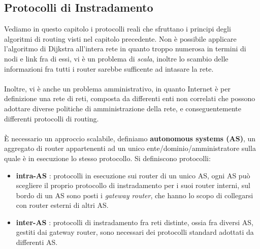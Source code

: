 \documentclass[12pt, letterpaper]{article}
\newcommand{\acc}{\\\hphantom{}\\}
\begin{document}
\subsection{Protocolli di Instradamento}
Vediamo in questo capitolo i protocolli reali che sfruttano i principi degli algoritmi di routing visti nel capitolo 
precedente. Non è possibile applicare l'algoritmo di Dijkstra all'intera rete in quanto troppo numerosa in termini di 
nodi e link fra di essi, vi è un problema di \textit{scala}, inoltre lo scambio delle informazioni fra tutti i router sarebbe 
sufficente ad intasare la rete.\acc 
Inoltre, vi è anche un problema amministrativo, in quanto Internet è per definizione una rete di reti, composta da differenti enti  
non correlati che possono adottare diverse politiche di amministrazione della rete, e conseguentemente differenti protocolli di routing. \acc 
È necessario un approccio scalabile, definiamo \textbf{autonomous systems (AS)}, un aggregato di router appartenenti ad 
un unico ente/dominio/amministratore sulla quale è in esecuzione lo stesso protocollo. Si definiscono protocolli:\begin{itemize}
    \item \textbf{intra-AS} : protocolli in esecuzione sui router di un unico AS, ogni AS può scegliere il proprio protocollo 
    di instradamento per i suoi router interni, sul bordo di un AS sono posti i \textit{gateway router}, che hanno lo scopo 
    di collegarsi con router esterni di altri AS.
    \item \textbf{inter-AS} : protocolli di instradamento fra reti distinte, ossia fra diversi AS, gestiti dai gateway router, 
    sono necessari dei protocolli standard adottati da differenti AS.
\end{itemize}
\end{document}
